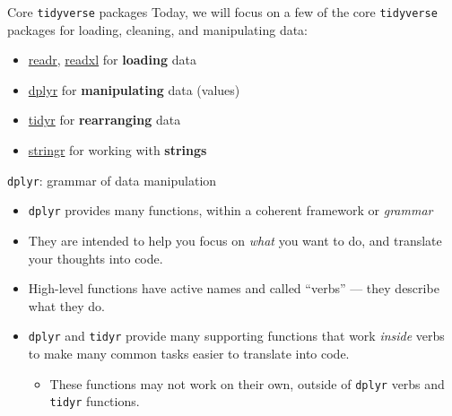 \documentclass[
  11pt,
  ignorenonframetext,
]{beamer}
\providecommand{\tightlist}{%
  \setlength{\itemsep}{0pt}\setlength{\parskip}{0pt}}
\begin{document}
\begin{frame}[fragile]{Core \texttt{tidyverse} packages}
\protect\hypertarget{core-tidyverse-packages}{}
Today, we will focus on a few of the core \texttt{tidyverse} packages
for loading, cleaning, and manipulating data:

\begin{itemize}
\tightlist
\item
  \href{https://readr.tidyverse.org/}{readr},
  \href{https://readxl.tidyverse.org/}{readxl} for \textbf{loading} data
\item
  \href{https://dplyr.tidyverse.org/}{dplyr} for \textbf{manipulating}
  data (values)
\item
  \href{https://tidyr.tidyverse.org/}{tidyr} for \textbf{rearranging}
  data
\item
  \href{https://stringr.tidyverse.org/}{stringr} for working with
  \textbf{strings}
\end{itemize}
\end{frame}

\begin{frame}[fragile]{\texttt{dplyr}: grammar of data manipulation}
\protect\hypertarget{dplyr-grammar-of-data-manipulation}{}
\begin{itemize}
\item
  \texttt{dplyr} provides many functions, within a coherent framework or
  \emph{grammar}
\item
  They are intended to help you focus on \emph{what} you want to do, and
  translate your thoughts into code.
\item
  High-level functions have active names and called ``verbs'' --- they
  describe what they do.
\item
  \texttt{dplyr} and \texttt{tidyr} provide many supporting functions
  that work \emph{inside} verbs to make many common tasks easier to
  translate into code.

  \begin{itemize}
  \tightlist
  \item
    These functions may not work on their own, outside of \texttt{dplyr}
    verbs and \texttt{tidyr} functions.
  \end{itemize}
\end{itemize}
\end{frame}
\end{document}
